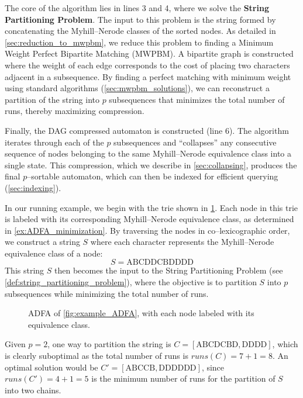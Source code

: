 The core of the algorithm lies in lines 3 and 4, where we solve the \textbf{String Partitioning Problem}. The input to this problem is the string formed by concatenating the Myhill--Nerode classes of the sorted nodes. As detailed in \cref{sec:reduction_to_mwpbm}, we reduce this problem to finding a Minimum Weight Perfect Bipartite Matching (MWPBM). A bipartite graph is constructed where the weight of each edge corresponds to the cost of placing two characters adjacent in a subsequence. By finding a perfect matching with minimum weight using standard algorithms (\cref{sec:mwpbm_solutions}), we can reconstruct a partition of the string into $p$ subsequences that minimizes the total number of runs, thereby maximizing compression.

Finally, the DAG compressed automaton is constructed (line 6). The algorithm iterates through each of the $p$ subsequences and ``collapses'' any consecutive sequence of nodes belonging to the same Myhill--Nerode equivalence class into a single state. This compression, which we describe in \cref{sec:collapsing}, produces the final $p$--sortable automaton, which can then be indexed for efficient querying (\cref{sec:indexing}).

\begin{example} \label{ex:string_example}
    In our running example, we begin with the trie shown in \cref{fig:mn-compressed-tree}. Each node in this trie is labeled with its corresponding Myhill--Nerode equivalence class, as determined in \cref{ex:ADFA_minimization}. By traversing the nodes in co--lexicographic order, we construct a string $S$ where each character represents the Myhill--Nerode equivalence class of a node:
    \[
        S = \text{ABCDDCBDDDD}
    \]
    This string $S$ then becomes the input to the String Partitioning Problem (see \cref{def:string_partitioning_problem}), where the objective is to partition $S$ into $p$ subsequences while minimizing the total number of runs.

    \begin{figure}[H]
        \centering
        
        \caption{ADFA of \cref{fig:example_ADFA}, with each node labeled with its equivalence class.}
        \label{fig:mn-compressed-tree}
    \end{figure}

    Given $p = 2$, one way to partition the string is $C = [\text{ABCDCBD}, \text{DDDD}]$, which is clearly suboptimal as the total number of runs is $runs(C) = 7 + 1 = 8$.
    An optimal solution would be $C' = [\text{ABCCB}, \text{DDDDDD}]$, since $runs(C') = 4 + 1 = 5$ is the minimum number of runs for the partition of $S$ into two chains.
    
\end{example}